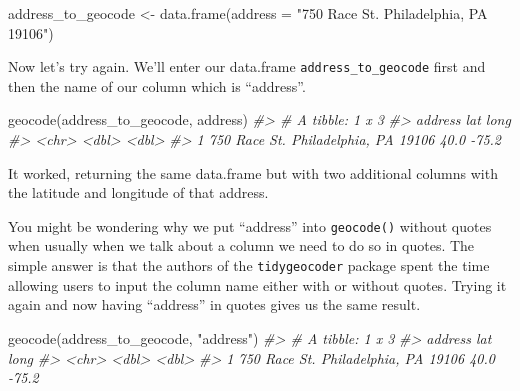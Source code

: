 \documentclass[
]{krantz}
\makeatletter
\newenvironment{Shaded}{\begin{snugshade}}{\end{snugshade}}
\newcommand{\AttributeTok}[1]{\textcolor[rgb]{0.61,0.61,0.61}{#1}}
\newcommand{\CommentTok}[1]{\textcolor[rgb]{0.37,0.37,0.37}{\textit{#1}}}
\newcommand{\FunctionTok}[1]{\textcolor[rgb]{0,0,0}{#1}}
\newcommand{\NormalTok}[1]{#1}
\newcommand{\OtherTok}[1]{\textcolor[rgb]{0.37,0.37,0.37}{#1}}
\newcommand{\StringTok}[1]{\textcolor[rgb]{0.5,0.5,0.5}{#1}}
\newenvironment{kframe}{%
\medskip{}
\setlength{\fboxsep}{.8em}
 \def\at@end@of@kframe{}%
 \ifinner\ifhmode%
  \def\at@end@of@kframe{\end{minipage}}%
  \begin{minipage}{\columnwidth}%
 \fi\fi%
 \def\FrameCommand##1{\hskip\@totalleftmargin \hskip-\fboxsep
 \colorbox{shadecolor}{##1}\hskip-\fboxsep
     \hskip-\linewidth \hskip-\@totalleftmargin \hskip\columnwidth}%
 \MakeFramed {\advance\hsize-\width
   \@totalleftmargin\z@ \linewidth\hsize
   \@setminipage}}%
 {\par\unskip\endMakeFramed%
 \at@end@of@kframe}
\renewenvironment{Shaded}{\begin{kframe}}{\end{kframe}}
\makeatother
\begin{document}
\begin{Shaded}
\begin{Highlighting}[]
\NormalTok{address\_to\_geocode }\OtherTok{\textless{}{-}} \FunctionTok{data.frame}\NormalTok{(}\AttributeTok{address =} \StringTok{"750 Race St. Philadelphia, PA 19106"}\NormalTok{)}
\end{Highlighting}
\end{Shaded}

Now let's try again. We'll enter our data.frame \texttt{address\_to\_geocode} first and then the name of our column which is ``address''.

\begin{Shaded}
\begin{Highlighting}[]
\FunctionTok{geocode}\NormalTok{(address\_to\_geocode, address)}
\CommentTok{\#\textgreater{} \# A tibble: 1 x 3}
\CommentTok{\#\textgreater{}   address                               lat  long}
\CommentTok{\#\textgreater{}   \textless{}chr\textgreater{}                               \textless{}dbl\textgreater{} \textless{}dbl\textgreater{}}
\CommentTok{\#\textgreater{} 1 750 Race St. Philadelphia, PA 19106  40.0 {-}75.2}
\end{Highlighting}
\end{Shaded}

It worked, returning the same data.frame but with two additional columns with the latitude and longitude of that address.

You might be wondering why we put ``address'' into \texttt{geocode()} without quotes when usually when we talk about a column we need to do so in quotes. The simple answer is that the authors of the \texttt{tidygeocoder} package spent the time allowing users to input the column name either with or without quotes. Trying it again and now having ``address'' in quotes gives us the same result.

\begin{Shaded}
\begin{Highlighting}[]
\FunctionTok{geocode}\NormalTok{(address\_to\_geocode, }\StringTok{"address"}\NormalTok{)}
\CommentTok{\#\textgreater{} \# A tibble: 1 x 3}
\CommentTok{\#\textgreater{}   address                               lat  long}
\CommentTok{\#\textgreater{}   \textless{}chr\textgreater{}                               \textless{}dbl\textgreater{} \textless{}dbl\textgreater{}}
\CommentTok{\#\textgreater{} 1 750 Race St. Philadelphia, PA 19106  40.0 {-}75.2}
\end{Highlighting}
\end{Shaded}
\end{document}
